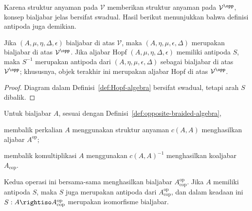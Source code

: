 Karena struktur anyaman pada $\mathcal{V}$ memberikan struktur anyaman pada
$\mathcal{V}^{\opp}$, konsep bialjabar jelas bersifat swadual. Hasil berikut
menunjukkan bahwa definisi antipoda juga demikian.

\begin{proposition}\label{prop:bialgebra-duality}
	Jika $(A,\mu,\eta,\Delta,\epsilon)$ bialjabar di atas $\mathcal{V}$, maka
	$(A,\eta,\mu,\epsilon,\Delta)$ merupakan bialjabar di atas
	$\mathcal{V}^{\opp}$. Jika aljabar Hopf
	$(A,\mu,\eta,\Delta,\epsilon)$ memiliki antipoda $S$, maka $S^{-1}$
	merupakan antipoda dari $(A,\eta,\mu,\epsilon,\Delta)$ sebagai bialjabar
	di atas $\mathcal{V}^{\opp}$; khususnya, objek terakhir ini merupakan
	aljabar Hopf di atas $\mathcal{V}^{\opp}$.
\end{proposition}

\begin{proof}
	Diagram dalam Definisi~\ref{def:Hopf-algebra} bersifat swadual, tetapi arah
	$S$ dibalik.
\end{proof}

\begin{proposition}\label{prop:Hopf-antiautomorphism}
	Untuk bialjabar $A$, sesuai dengan
	Definisi~\ref{def:opposite-braided-algebra},
	\begin{compactitem}
		\item membalik perkalian $A$ menggunakan struktur anyaman $c(A,A)$
		menghasilkan aljabar $A^{\mathrm{op}}$;
		\item membalik komultiplikasi $A$ menggunakan $c(A,A)^{-1}$
		menghasilkan koaljabar $A_{\mathrm{cop}}$.
	\end{compactitem}
	Kedua operasi ini bersama-sama menghasilkan bialjabar
	$A^{\mathrm{op}}_{\mathrm{cop}}$. Jika $A$ memiliki antipoda $S$, maka $S$
	juga merupakan antipoda dari $A^{\mathrm{op}}_{\mathrm{cop}}$, dan dalam
	keadaan ini $S:A\rightiso A^{\mathrm{op}}_{\mathrm{cop}}$ merupakan
	isomorfisme bialjabar.
\end{proposition}

